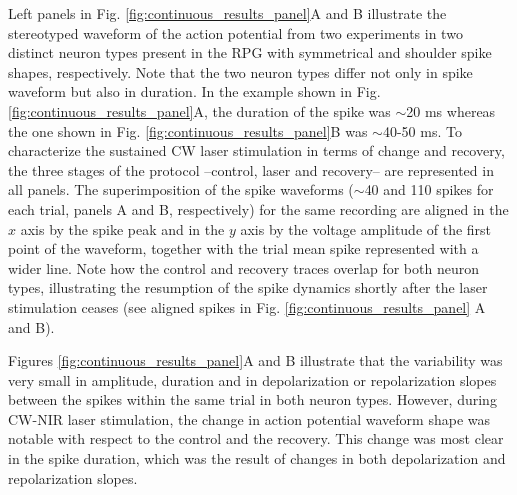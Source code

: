 Left panels in Fig. \ref{fig:continuous_results_panel}A and B illustrate the stereotyped waveform of the action potential from two experiments in two distinct neuron types present in the RPG with symmetrical and shoulder spike shapes, respectively. Note that the two neuron types differ not only in spike waveform but also in duration. In the example shown in Fig. \ref{fig:continuous_results_panel}A, the duration of the spike was $\sim$20 ms whereas the one shown in Fig. \ref{fig:continuous_results_panel}B was $\sim$40-50 ms. To characterize the sustained CW laser stimulation in terms of change and recovery, the three stages of the protocol --control, laser and recovery-- are represented in all panels. The superimposition of the spike waveforms ($\sim$40 and 110 spikes for each trial, panels A and B, respectively) for the same recording are aligned in the $x$ axis by the spike peak and in the $y$ axis by the voltage amplitude of the first point of the waveform, together with the trial mean spike represented with a wider line. Note how the control and recovery traces overlap for both neuron types, illustrating the resumption of the spike dynamics shortly after the laser stimulation ceases (see aligned spikes in Fig. \ref{fig:continuous_results_panel} A and B).

Figures \ref{fig:continuous_results_panel}A and B illustrate that the variability was very small in amplitude, duration and in depolarization or repolarization slopes between the spikes within the same trial in both neuron types. However, during CW-NIR laser stimulation, the change in action potential waveform shape was notable with respect to the control and the recovery. This change was most clear in the spike duration, which was the result of changes in both depolarization and repolarization slopes. 


